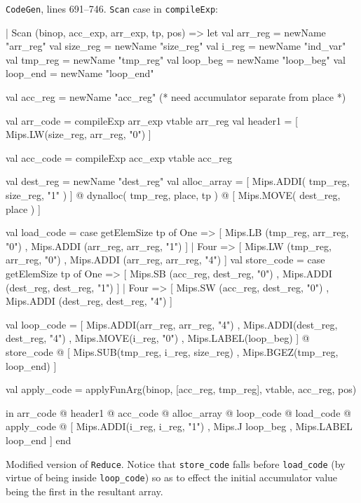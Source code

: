\documentclass[12pt, a4paper]{article}
\begin{document}
\texttt{CodeGen}, lines 691--746. \texttt{Scan} case in \texttt{compileExp}:
\begin{lstlistings}
  | Scan (binop, acc_exp, arr_exp, tp, pos) =>
        let val arr_reg  = newName "arr_reg"   
            val size_reg = newName "size_reg"  
            val i_reg    = newName "ind_var"   
            val tmp_reg  = newName "tmp_reg"   
            val loop_beg = newName "loop_beg"
            val loop_end = newName "loop_end"

            val acc_reg = newName "acc_reg" (* need accumulator separate from place *)

            val arr_code = compileExp arr_exp vtable arr_reg
            val header1 = [ Mips.LW(size_reg, arr_reg, "0") ]

            val acc_code = compileExp acc_exp vtable acc_reg

            val dest_reg = newName "dest_reg"
            val alloc_array = [ Mips.ADDI( tmp_reg, size_reg, "1" ) ]
                            @ dynalloc( tmp_reg, place, tp )
                            @ [ Mips.MOVE( dest_reg, place ) ]

            val load_code =
                case getElemSize tp of
                    One =>  [ Mips.LB   (tmp_reg, arr_reg, "0")
                            , Mips.ADDI (arr_reg, arr_reg, "1") ]
                  | Four => [ Mips.LW   (tmp_reg, arr_reg, "0")
                            , Mips.ADDI (arr_reg, arr_reg, "4") ]
            val store_code =
                case getElemSize tp of
                    One =>  [ Mips.SB   (acc_reg, dest_reg, "0")
                            , Mips.ADDI (dest_reg, dest_reg, "1") ]
                  | Four => [ Mips.SW   (acc_reg, dest_reg, "0")
                            , Mips.ADDI (dest_reg, dest_reg, "4") ]

            val loop_code =
                [ Mips.ADDI(arr_reg, arr_reg, "4")
                , Mips.ADDI(dest_reg, dest_reg, "4")
                , Mips.MOVE(i_reg, "0")
                , Mips.LABEL(loop_beg) ]
                @ store_code @
                [ Mips.SUB(tmp_reg, i_reg, size_reg)
                , Mips.BGEZ(tmp_reg, loop_end) ]

            val apply_code =
                applyFunArg(binop, [acc_reg, tmp_reg], vtable, acc_reg, pos)

        in arr_code
         @ header1
         @ acc_code
         @ alloc_array
         @ loop_code
         @ load_code
         @ apply_code
         @ [ Mips.ADDI(i_reg, i_reg, "1")
           , Mips.J loop_beg
           , Mips.LABEL loop_end ]
        end
\end{lstlistings}
Modified version of \texttt{Reduce}. Notice that \verb+store_code+ falls before
\verb+load_code+ (by virtue of being inside \verb+loop_code+) so as to effect the
initial accumulator value being the first in the resultant array.
\end{document}
